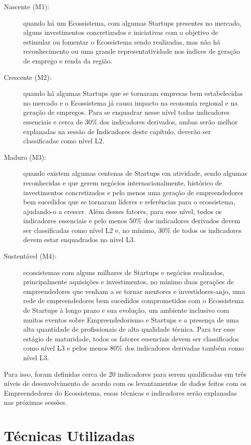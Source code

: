 \begin{description}
  \item [Nascente (M1):] quando há um Ecossistema, com algumas Startups presentes no mercado, alguns investimentos concretizados e iniciativas com o objetivo de estimular ou fomentar o Ecossistema sendo
  realizadas, mas não há reconhecimento ou uma grande representatividade nos índices de geração de emprego e renda da região.
  \item [Crescente (M2):] quando há algumas Startups que se tornaram empresas bem estabelecidas no mercado e o Ecossistema já causa impacto na economia regional e na geração de empregos. Para se enquadrar
  nesse nível todas indicadores essenciais e cerca de 30\% dos indicadores derivados, ambas serão melhor explanadas na sessão de Indicadores deste capítulo, deverão ser classificadas como nível L2.
  \item [Maduro (M3):] quando existem algumas centenas de Startups em atividade, sendo algumas reconhecidas e que gerem negócios internacionalmente, histórico de investimentos concretizados e
  pelo menos uma geração de empreendedores bem sucedidos que se tornaram líderes e referências para o ecossistema, ajudando-o a crescer. Além desses fatores, para esse nível, todos os indicadores essenciais
  e pelo menos 50\% dos indicadores derivados devem ser classificadas como nível L2 e, no mínimo, 30\% de todos os indicadores devem estar enquadrados no nível L3.
  \item [Sustentável (M4):] ecossistemas com alguns milhares de Startups e negócios realizados, principalmente aquisições e investimentos, no mínimo duas gerações de empreendedores que venham a
  se tornar mentores e investidores-anjo, uma rede de empreendedores bem sucedidos comprometidos com o Ecossistema de Startups à longo prazo e sua evolução, um ambiente inclusivo com muitos
  eventos sobre Empreendedorismo e Startups e a presença de uma alta quantidade de profissionais de alta qualidade técnica. Para ter esse estágio de maturidade, todos os fatores essenciais devem
  ser classificados como nível L3 e pelos menos 80\% dos indicadores derivadas também como nível L3.
\end{description}

Para isso, foram definidas cerca de 20 indicadores para serem qualificadas em três níveis de desenvolvimento de acordo com os levantamentos de dados feitos com os Empreendedores do Ecossistema, essas
técnicas e indicadores serão explanadas nas próximas sessões.

\section{Técnicas Utilizadas}
\label{section:tecnicas_utilizadas}

